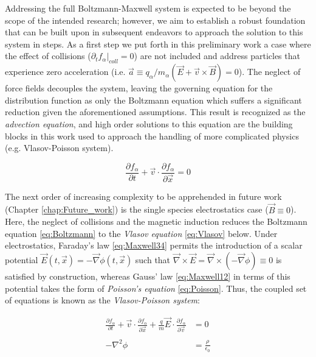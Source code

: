 \documentclass[11pt,titlepage]{report}
\begin{document}
Addressing the full Boltzmann-Maxwell system is expected to be beyond the scope of the intended research; however, we aim to establish a robust foundation that can be built upon in subsequent endeavors to approach the solution to this system in steps. As a first step we put forth in this preliminary work a case where the effect of collisions ($\partial_t f_{\alpha} |_{coll} = 0$) are not included and address particles that experience zero acceleration (i.e. $\vec{a} \equiv q_{\alpha} / m_{\alpha} (\vec{E} + \vec{v} \times \vec{B}) = 0$). The neglect of force fields decouples the system, leaving the governing equation for the distribution function as only the Boltzmann equation which suffers a significant reduction given the aforementioned assumptions. This result is recognized as the \emph{advection equation}, and high order solutions to this equation are the building blocks in this work used to approach the handling of more complicated physics (e.g. Vlasov-Poisson system).

\vspace{1em}
\begin{equation}
\frac{\partial f_{\alpha}}{\partial t} + \vec{v}\cdot\frac{\partial f_{\alpha}}{\partial \vec{x}} = 0 \label{eq:Advection}
\end{equation}

The next order of increasing complexity to be apprehended in future work (Chapter \ref{chap:Future_work}) is the single species electrostatics case ($\vec{B} \equiv 0$). Here, the neglect of collisions and the magnetic induction reduces the Boltzmann equation \eqref{eq:Boltzmann} to the \emph{Vlasov equation} \eqref{eq:Vlasov} below. Under electrostatics, Faraday's law \eqref{eq:Maxwell34} permits the introduction of a scalar potential $\vec{E}(t,\vec{x}) = -\vec{\nabla}\phi(t,\vec{x})$ such that $\vec{\nabla} \times \vec{E} = \vec{\nabla} \times (-\vec{\nabla}\phi) \equiv 0$ is satisfied by construction, whereas Gauss' law \eqref{eq:Maxwell12} in terms of this potential takes the form of \emph{Poisson's equation} \eqref{eq:Poisson}. Thus, the coupled set of equations is known as the \emph{Vlasov-Poisson system}:

\vspace{1em}
\begin{subequations}
\begin{align}
\frac{\partial f_{\alpha}}{\partial t} + \vec{v}\cdot\frac{\partial f_{\alpha}}{\partial \vec{x}} + \frac{q}{m}\vec{E}\cdot\frac{\partial f_{\alpha}}{\partial \vec{v}} &= 0 \label{eq:Vlasov}\\
&\nonumber\\
-\nabla^2\phi &= \frac{\rho}{\epsilon_0} \label{eq:Poisson}
\end{align}
\end{subequations}
\end{document}
